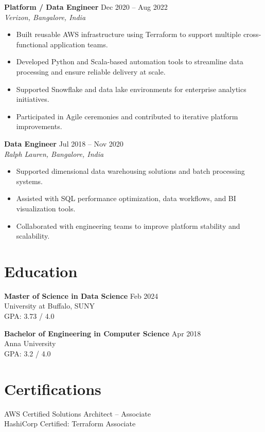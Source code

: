 \documentclass[10pt]{article}
\begin{document}
\textbf{Platform / Data Engineer} \hfill Dec 2020 -- Aug 2022 \\
\textit{Verizon, Bangalore, India}
\begin{itemize}[leftmargin=*, itemsep=3pt]
    \item Built reusable AWS infrastructure using Terraform to support multiple cross-functional application teams.
    \item Developed Python and Scala-based automation tools to streamline data processing and ensure reliable delivery at scale.
    \item Supported Snowflake and data lake environments for enterprise analytics initiatives.
    \item Participated in Agile ceremonies and contributed to iterative platform improvements.
\end{itemize}

\textbf{Data Engineer} \hfill Jul 2018 -- Nov 2020 \\
\textit{Ralph Lauren, Bangalore, India}
\begin{itemize}[leftmargin=*, itemsep=3pt]
    \item Supported dimensional data warehousing solutions and batch processing systems.
    \item Assisted with SQL performance optimization, data workflows, and BI visualization tools.
    \item Collaborated with engineering teams to improve platform stability and scalability.
\end{itemize}

\section*{Education}

\textbf{Master of Science in Data Science} \hfill Feb 2024 \\
University at Buffalo, SUNY \\
GPA: 3.73 / 4.0

\textbf{Bachelor of Engineering in Computer Science} \hfill Apr 2018 \\
Anna University \\
GPA: 3.2 / 4.0

\section*{Certifications}
AWS Certified Solutions Architect – Associate \\
HashiCorp Certified: Terraform Associate
\end{document}
